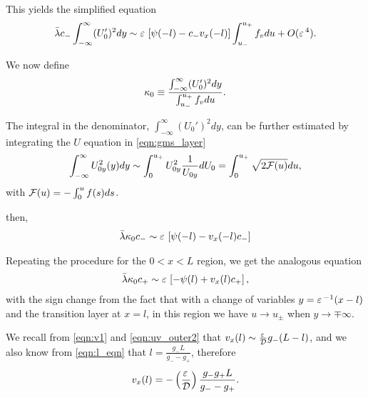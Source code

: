This yields the simplified equation
% 
\begin{equation*}
\begin{split}
	\bar{\lambda}c_-\int_{-\infty}^{\infty}(U_0')^2 dy \sim \varepsilon\,\left[\psi(-l) - c_-v_x(-l)\right]\int_{u_-}^{u_+}f_vdu + O(\varepsilon\,^4).
\end{split}
\end{equation*}
% 

We now define 
% 
\begin{equation*}
\begin{split}
	\kappa_0 \equiv \frac{\int_{-\infty}^{\infty}(U_0')^2 dy}{\int_{u_-}^{u_+}f_vdu}.
\end{split}
\end{equation*}
% 

The integral in the denominator, $\int_{-\infty}^{\infty}(U_0')^2dy$, can be further estimated by integrating the $U$ equation in \eqref{eqn:gms_layer}
% 
\begin{equation*}
\label{eqn:beta}
\begin{split}
  \int_{-\infty}^{\infty}U_{0y}^2(y)dy \sim \int_{0}^{u_+}U_{0y}^2\frac{1}{U_{0y}}dU_0 = \int_0^{u_+}\sqrt{2\mathcal{F}(u)}du,
\end{split}
\end{equation*}
% 
with $\mathcal{F}(u)=-\int_0^uf(s)ds$.


then, 
% 
\begin{equation*}
\begin{split}
	\bar{\lambda}\kappa_0c_-\sim\varepsilon\,\left[\psi(-l) - v_x(-l)c_-\right]
\end{split}
\end{equation*}
% 

Repeating the procedure for the $0<x<L$ region, we get the analogous equation
% 
\begin{equation*}
\begin{split}
	\bar{\lambda}\kappa_0c_+\sim\varepsilon\,\left[-\psi(l) + v_x(l)c_+\right],
\end{split}
\end{equation*}
% 
with the sign change from the fact that with a change of variables $y=\varepsilon\,^{-1}(x-l)$ and the transition layer at $x=l$, in this region we have $u\rightarrow u_{\pm}$ when $y\rightarrow\mp\infty$.

We recall from \eqref{eqn:v1} and \eqref{eqn:uv_outer2} that $v_x(l) \sim \frac{\varepsilon\,}{\mathcal{D}}g_-(L-l)$, 
and we also know from \eqref{eqn:l_eqn} that $l = \frac{g_-L}{g_--g_+}$, therefore
% 
\begin{equation*}
\begin{split}
	v_x(l) = -\left(\frac{\varepsilon\,}{\mathcal{D}}\right)\frac{g_-g_+L}{g_--g_+}.
\end{split}
\end{equation*}
% 

